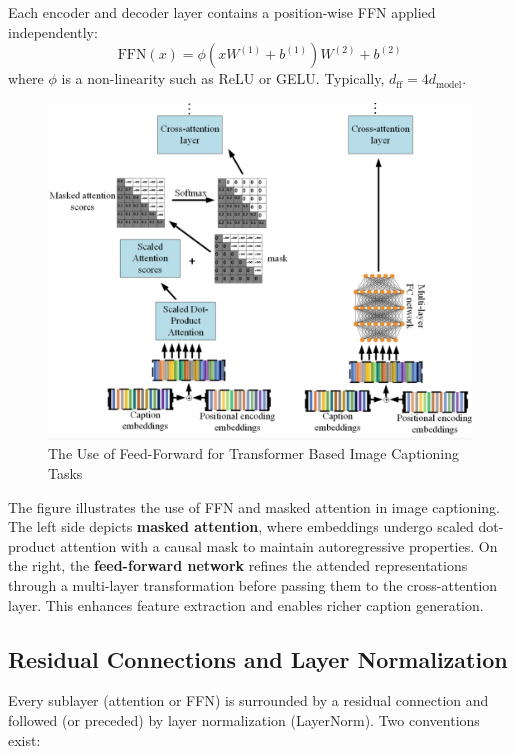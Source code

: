 Each encoder and decoder layer contains a position-wise FFN applied independently:
\[
\text{FFN}(x) = \phi(xW^{(1)} + b^{(1)})W^{(2)} + b^{(2)}
\]
where $\phi$ is a non-linearity such as ReLU or GELU. Typically, $d_{\text{ff}} = 4d_{\text{model}}$.

\begin{figure}[H]
    \centering
    \includegraphics[width=\textwidth]{img/chap03/feed-forward.PNG} 
    \caption{The Use of Feed-Forward for Transformer Based Image Captioning Tasks}
    \label{fig:feed-forward}
\end{figure}

The figure illustrates the use of FFN and masked attention in image captioning. The left side depicts \textbf{masked attention}, where embeddings undergo scaled dot-product attention with a causal mask to maintain autoregressive properties. On the right, the \textbf{feed-forward network} refines the attended representations through a multi-layer transformation before passing them to the cross-attention layer. This enhances feature extraction and enables richer caption generation.

\subsection{Residual Connections and Layer Normalization}

Every sublayer (attention or FFN) is surrounded by a residual connection and followed (or preceded) by layer normalization (LayerNorm). Two conventions exist:

